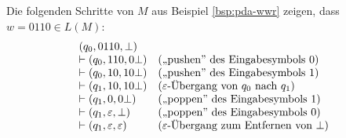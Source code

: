 \begin{Bsp*}
  Die folgenden Schritte von $M$ aus Beispiel \ref{bsp:pda-wwr} zeigen, dass $w = 0110 \in L(M)$:
  \begin{displaymath}
  \begin{array}{ll}
    (q_0, 0110, \bot) \\
    \vdash (q_0, 110, 0\bot)  &\text{(,,pushen'' des Eingabesymbols $0$)}\\
    \vdash (q_0, 10, 10\bot)  &\text{(,,pushen'' des Eingabesymbols $1$)}\\
    \vdash (q_1, 10, 10\bot)  &\text{($\varepsilon$-Übergang von $q_0$ nach $q_1$)} \\
    \vdash (q_1, 0, 0\bot)  &\text{(,,poppen'' des Eingabesymbols $1$)}\\
    \vdash (q_1,\varepsilon, \bot) &\text{(,,poppen'' des Eingabesymbols $0$)}\\
    \vdash (q_1, \varepsilon, \varepsilon) &\text{($\varepsilon$-Übergang zum Entfernen von $\bot$)}
  \end{array}
\end{displaymath}
\end{Bsp*}

